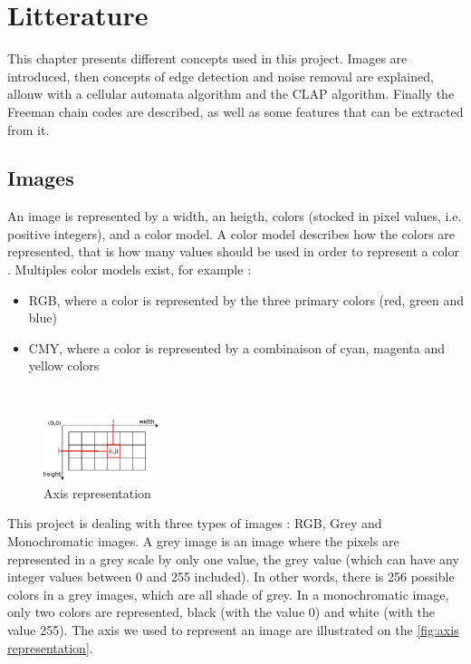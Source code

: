 \chapter{Litterature}

This chapter presents different concepts used in this project. Images are introduced, then concepts of edge detection and noise removal are explained, allonw with a cellular automata algorithm and the \gls{CLAP} algorithm. Finally the Freeman chain codes are described, as well as some features that can be extracted from it. 

\section{Images}

An image is represented by a width, an heigth, colors (stocked in pixel values, i.e. positive integers), and a color model. A color model describes how the colors are represented, that is how many values should be used in order to represent a color \cite{bib:image:ColorModel}. Multiples color models exist, for example : 
\begin{itemize}
	\item RGB, where a color is represented by the three primary colors (red, green and blue)
	\item CMY, where a color is represented by a combinaison of cyan, magenta and yellow colors
\end{itemize}


~~

\begin{figure}
	\centering
	\includegraphics[width=0.3\textwidth]{images/axis/axis_representation}
	\caption{Axis representation}
	\label{fig:axis representation}
\end{figure}


This project is dealing with three types of images : RGB, Grey and Monochromatic images. A grey image is an image where the pixels are represented in a grey scale by only one value, the grey value (which can have any integer values between 0 and 255 included). In other words, there is 256 possible colors in a grey images, which are all shade of grey. In a monochromatic image, only two colors are represented, black (with the value 0) and white (with the value 255). The axis we used to represent an image are illustrated on the \vref{fig:axis representation}. 

